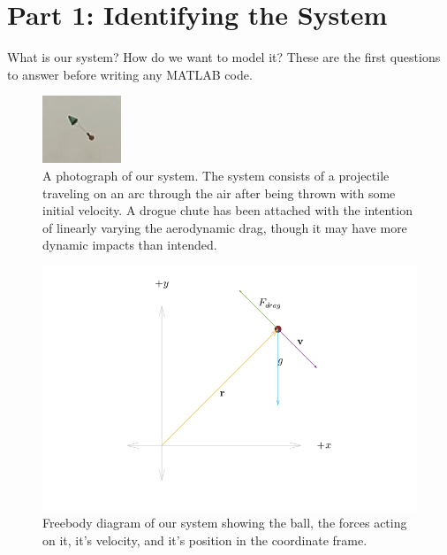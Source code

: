 \documentclass[12pt, letterpaper]{article}
\begin{document}
\section{Part 1: Identifying the System}
What is our system? How do we want to model it? These are the first questions to answer before writing any MATLAB code. 

\begin{figure}[t]
\centering
\includegraphics[width=0.5\linewidth]{images/BallMidFlight.png}
\caption{\label{fig:BallMidFlight} A photograph of our system. The system consists of a projectile traveling on an arc through the air after being thrown with some initial velocity. A drogue chute has been attached with the intention of linearly varying the aerodynamic drag, though it may have more dynamic impacts than intended.}
\end{figure}

\begin{figure}[t]
\centering
\includegraphics[width=\linewidth]{images/freebody1.png}
\caption{\label{fig:freebody1} Freebody diagram of our system showing the ball, the forces acting on it, it's velocity, and it's position in the coordinate frame.}
\end{figure}
\end{document}
